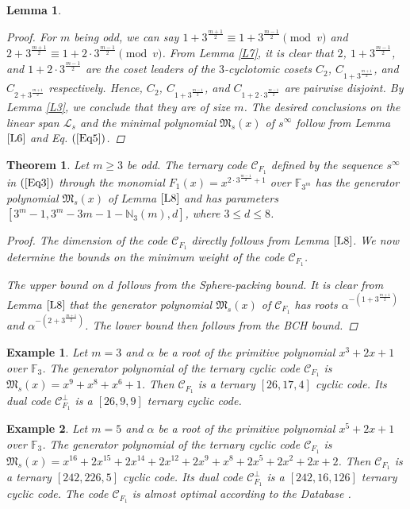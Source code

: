 \documentclass[pdflatex,sn-mathphys-num]{sn-jnl}%
\newtheorem{lemma}{Lemma}
\theoremstyle{thmstyleone}%
\newtheorem{theorem}{Theorem}%
\theoremstyle{thmstyletwo}%
\newtheorem{example}{Example}%
\theoremstyle{thmstylethree}%
\begin{document}
\begin{lemma}
\begin{proof}
        For $m$ being odd, we can say $1+3^{\frac{m+1}{2}}\equiv 1+3^{\frac{m-1}{2}}\pmod{v}$ and $2+3^{\frac{m+1}{2}}\equiv 1+2\cdot3^{\frac{m-1}{2}}\pmod{v}$. From Lemma \ref{L7}, it is clear that $2$, $1+3^{\frac{m-1}{2}}$, and $1+2\cdot3^{\frac{m-1}{2}}$ are the coset leaders of the $3$-cyclotomic cosets $C_{2}$, $C_{1+3^{\frac{m+1}{2}}}$, and $C_{2+3^{\frac{m+1}{2}}}$ respectively. Hence, $C_{2}$, $C_{1+3^{\frac{m-1}{2}}}$, and $C_{1+2\cdot3^{\frac{m-1}{2}}}$ are pairwise disjoint. By Lemma \ref{L3}, we conclude that they are of size $m$.
        \vskip 1pt
        The desired conclusions on the linear span $\mathcal{L}_{s}$ and the minimal polynomial $\mathfrak{M}_{s}(x)$ of $s^{\infty}$ follow from Lemma $\ref{L6}$ and Eq. $(\ref{Eq5})$.
    \end{proof}
\end{lemma}

\begin{theorem}\label{Th12}
    Let $m\geq 3$ be odd. The ternary code $\mathcal{C}_{F_{1}}$ defined by the sequence $s^{\infty}$ in $(\ref{Eq3})$ through the monomial $F_{1}(x)=x^{2\cdot 3^{\frac{m-1}{2}}+1}$ over $\mathbb{F}_{3^m}$ has the generator polynomial $\mathfrak{M}_{s}(x)$ of Lemma $\ref{L8}$ and has parameters $[3^m-1,3^m-3m-1-\mathbb{N}_{3}(m),d]$, where $3\leq d\leq 8$.
    \begin{proof}
        The dimension of the code $\mathcal{C}_{F_{1}}$ directly follows from Lemma $\ref{L8}$. We now determine the bounds on the minimum weight of the code $\mathcal{C}_{F_{1}}$.
        \par The upper bound on $d$ follows from the Sphere-packing bound. It is clear from Lemma $\ref{L8}$ that the generator polynomial $\mathfrak{M}_{s}(x)$ of $\mathcal{C}_{F_{1}}$ has roots $\alpha^{-(1+3^{\frac{m+1}{2}})}$ and $\alpha^{-(2+3^{\frac{m+1}{2}})}$. The lower bound then follows from the BCH bound. 
        
    \end{proof}
\end{theorem}

\begin{example}
    Let $m=3$ and $\alpha$ be a root of the primitive polynomial $x^3+2x+1$ over $\mathbb{F}_{3}$. The generator polynomial of the ternary cyclic code $\mathcal{C}_{F_{1}}$ is $\mathfrak{M}_{s}(x)=x^9+x^8+x^6+1$. Then $\mathcal{C}_{F_{1}}$ is a ternary $[26,17,4]$ cyclic code. Its dual code $\mathcal{C}_{F_{1}}^{\perp}$ is a $[26, 9, 9]$ ternary cyclic code.
\end{example}
\vspace{1em}
\begin{example}
    Let $m=5$ and $\alpha$ be a root of the primitive polynomial $x^5+2x+1$ over $\mathbb{F}_{3}$. The generator polynomial of the ternary cyclic code $\mathcal{C}_{F_{1}}$ is $\mathfrak{M}_{s}(x)=x^{16} + 2x^{15} +  2x^{14} + 2x^{12} + 2x^9 + x^8 + 2x^5 + 2x^2 + 2x + 2$. Then $\mathcal{C}_{F_{1}}$ is a ternary $[242, 226, 5]$ cyclic code. Its dual code $\mathcal{C}_{F_{1}}^{\perp}$ is a $[242,16,126]$ ternary cyclic code. The code $\mathcal{C}_{F_{1}}$ is almost optimal according to the Database \textnormal{\cite{Database}}. 
\end{example}
\end{document}
